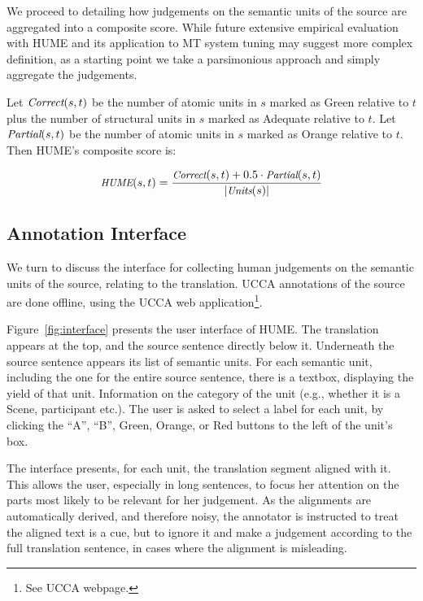 \documentclass[11pt]{article}
\newcommand{\figref}[1]{Figure~\ref{#1}}
\def\setsize#1{\lvert #1 \rvert}
\def\func#1{\text{\it #1}}  %
\def\HUME{\func{HUME}}
\def\Correct{\func{Correct}}
\def\Partial{\func{Partial}}
\def\Units{\func{Units}}
\begin{document}
We proceed to detailing how judgements on the semantic units
of the source are aggregated into a composite score.
While future extensive empirical evaluation with HUME and its application to MT
system tuning may suggest more complex definition,
as a starting point we take a parsimonious approach
and simply aggregate the judgements.


Let $\Correct(s,t)$ be the number of atomic units in $s$ marked as Green relative to $t$ plus
the number of structural units in $s$ marked as Adequate relative to $t$.
Let $\Partial(s,t)$ be the number of atomic units in $s$ marked as Orange relative
to $t$. Then HUME's composite score is:

\vspace{-.5cm}
\begin{equation}
  \small
  \HUME(s,t) = \frac{\Correct(s,t) + 0.5\cdot \Partial(s,t)}{\setsize{\Units(s)}}
\end{equation}



\subsection{Annotation Interface}

We turn to discuss the interface for collecting human judgements on the semantic units
of the source, relating to the translation. UCCA annotations of the source are done offline,
using the UCCA web application\footnote{See UCCA webpage.}.

\figref{fig:interface} presents the user interface of HUME. 
The translation appears at the top, and
the source sentence directly below it. Underneath the source sentence appears
its list of semantic units. For each semantic unit, including the one for the
entire source sentence, there is a textbox, displaying the yield of that unit.
Information on the category of the unit (e.g., whether it is a Scene, participant etc.).
The user is asked to select a label for each unit,
by clicking the ``A'', ``B'', Green, Orange, or Red buttons to the left of the unit's box.

The interface presents, for each unit, the translation segment aligned with it.
This allows the user, especially in long sentences, to focus her attention on the parts
most likely to be relevant for her judgement. As the alignments are automatically derived,
and therefore noisy, the annotator is instructed to treat the aligned text is a cue, but to ignore
it and make a judgement according to the full translation sentence, in cases where the alignment
is misleading.
\end{document}
